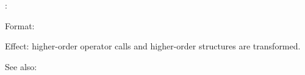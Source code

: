 \hitrans:

Format: 

Effect: higher-order operator calls and higher-order structures are transformed.

See also: \horizon
